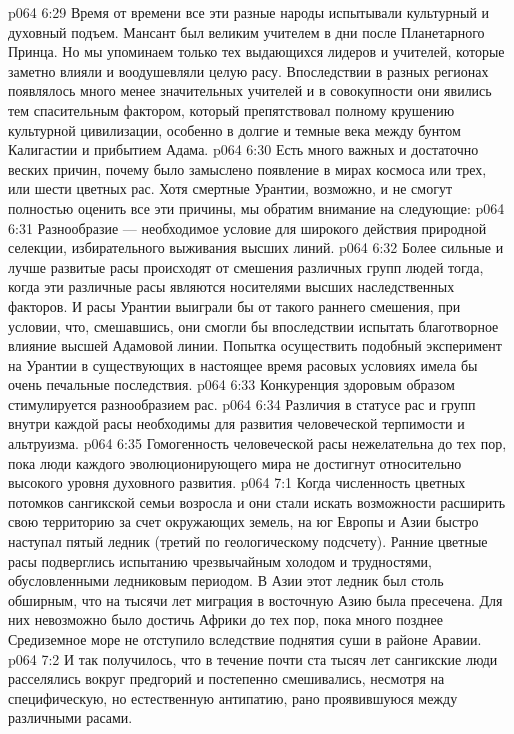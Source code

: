 \vs p064 6:29 \pc Время от времени все эти разные народы испытывали культурный и духовный подъем. Мансант был великим учителем в дни после Планетарного Принца. Но мы упоминаем только тех выдающихся лидеров и учителей, которые заметно влияли и воодушевляли целую расу. Впоследствии в разных регионах появлялось много менее значительных учителей и в совокупности они явились тем спасительным фактором, который препятствовал полному крушению культурной цивилизации, особенно в долгие и темные века между бунтом Калигастии и прибытием Адама.
\vs p064 6:30 \pc Есть много важных и достаточно веских причин, почему было замыслено появление в мирах космоса или трех, или шести цветных рас. Хотя смертные Урантии, возможно, и не смогут полностью оценить все эти причины, мы обратим внимание на следующие:
\vs p064 6:31 \bibnobreakspace Разнообразие --- необходимое условие для широкого действия природной селекции, избирательного выживания высших линий.
\vs p064 6:32 \pc {}\bibnobreakspace Более сильные и лучше развитые расы происходят от смешения различных групп людей тогда, когда эти различные расы являются носителями высших наследственных факторов. И расы Урантии выиграли бы от такого раннего смешения, при условии, что, смешавшись, они смогли бы впоследствии испытать благотворное влияние высшей Адамовой линии. Попытка осуществить подобный эксперимент на Урантии в существующих в настоящее время расовых условиях имела бы очень печальные последствия.
\vs p064 6:33 \pc {}\bibnobreakspace Конкуренция здоровым образом стимулируется разнообразием рас.
\vs p064 6:34 \pc {}\bibnobreakspace Различия в статусе рас и групп внутри каждой расы необходимы для развития человеческой терпимости и альтруизма.
\vs p064 6:35 \pc {}\bibnobreakspace Гомогенность человеческой расы нежелательна до тех пор, пока люди каждого эволюционирующего мира не достигнут относительно высокого уровня духовного развития.
\vs p064 7:1 Когда численность цветных потомков сангикской семьи возросла и они стали искать возможности расширить свою территорию за счет окружающих земель, на юг Европы и Азии быстро наступал пятый ледник (третий по геологическому подсчету). Ранние цветные расы подверглись испытанию чрезвычайным холодом и трудностями, обусловленными ледниковым периодом. В Азии этот ледник был столь обширным, что на тысячи лет миграция в восточную Азию была пресечена. Для них невозможно было достичь Африки до тех пор, пока много позднее Средиземное море не отступило вследствие поднятия суши в районе Аравии.
\vs p064 7:2 И так получилось, что в течение почти ста тысяч лет сангикские люди расселялись вокруг предгорий и постепенно смешивались, несмотря на специфическую, но естественную антипатию, рано проявившуюся между различными расами.
